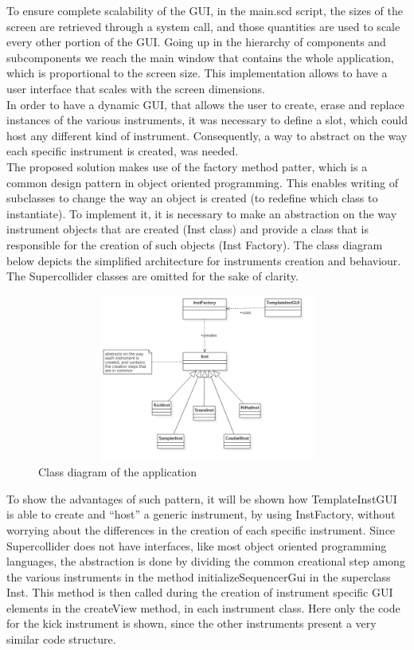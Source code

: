 \documentclass[main.tex]{subfiles}
\begin{document}
To ensure complete scalability of the GUI, in the main.scd script, the sizes of the screen are retrieved through a system call, and those quantities are used to scale every other portion of the GUI. Going up in the hierarchy of components and subcomponents we reach the main window that contains the whole application, which is proportional to the screen size. This implementation allows to have a user interface that scales with the screen dimensions.\\
[2mm]
In order to have a dynamic GUI, that allows the user to create, erase and replace instances of the various instruments, it was necessary to define a slot, which could host any different kind of instrument. Consequently, a way to abstract on the way each specific instrument is created, was needed.\\ 
The proposed solution makes use of the factory method patter, which is a common design pattern in object oriented programming. This enables writing of subclasses to change the way an object is created (to redefine which class to instantiate). 
To implement it, it is necessary to make an abstraction on the way instrument objects that are created (Inst class) and provide a class that is responsible for the creation of such objects (Inst Factory).
The class diagram below depicts the simplified architecture for instruments creation and behaviour. The Supercollider classes are omitted for the sake of clarity.
\begin{figure}[htbp]
\centering
\includegraphics[height=5.5cm, width=12cm, keepaspectratio]{images/factory_pattern_uml.png}
\caption{Class diagram of the application}
\label{fig:uml}
\end{figure}

To show the advantages of such pattern, it will be shown how TemplateInstGUI is able to create and “host” a generic instrument, by using InstFactory, without worrying about the differences in the creation of each specific instrument. Since Supercollider does not have interfaces, like most object oriented programming languages, the abstraction is done by dividing the common creational step among the various instruments in the method  initializeSequencerGui  in the superclass Inst. This method is then called during the creation of instrument specific GUI elements in the createView method, in each instrument class. Here only the code for the kick instrument is shown, since the other instruments present a very similar code structure.
\end{document}

